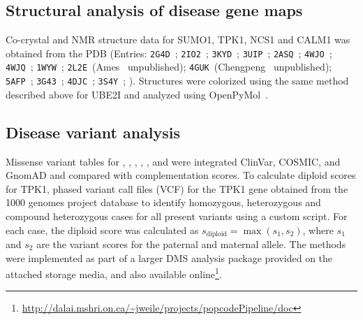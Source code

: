 \subsection{Structural analysis of disease gene maps}
Co-crystal and NMR structure data for SUMO1, TPK1, NCS1 and CALM1 was obtained from the PDB (Entries: \texttt{2G4D}~\cite{xu_crystal_2006}; \texttt{2IO2}~\cite{reverter_structural_2006}; \texttt{3KYD}~\cite{olsen_active_2010}; \texttt{3UIP}~\cite{gareau_determinants_2012}; \texttt{2ASQ}~\cite{song_small_2005}; \texttt{4WJO}~\cite{cappadocia_structural_2015-1}; \texttt{4WJQ}~\cite{cappadocia_structural_2015-1}; \texttt{1WYW}~\cite{baba_crystal_2005}; 
\texttt{2L2E}~(Ames \etal\ unpublished); \texttt{4GUK}~(Chengpeng \etal\ unpublished); \texttt{5AFP}~\cite{pandalaneni_neuronal_2015}; 
\texttt{3G43}~\cite{fallon_crystal_2009}; \texttt{4DJC}~\cite{sarhan_crystallographic_2012}; 
\texttt{3S4Y}~\cite{timm_crystal_2001}; ). Structures were colorized using the same method described above for UBE2I and analyzed using OpenPyMol~\cite{schrodinger_pymol_2016}.



\subsection{Disease variant analysis}
Missense variant tables for , , , , ,  and  were integrated ClinVar, COSMIC, and GnomAD and compared with complementation scores. To calculate diploid scores for TPK1, phased variant call files (VCF) for the TPK1 gene obtained from the 1000 genomes project database to identify homozygous, heterozygous and compound heterozygous cases for all present variants using a custom script. For each case, the diploid score was calculated as $s_\text{diploid} = \max(s_1,s_2)$, where $s_1$ and $s_2$ are the variant scores for the paternal and maternal allele. The methods were implemented as part of a larger DMS analysis package provided on the attached storage media, and also available online\footnote{\url{http://dalai.mshri.on.ca/~jweile/projects/popcodePipeline/doc}}.